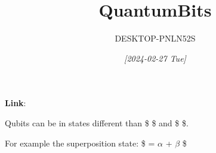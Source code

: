 \documentclass[11pt]{article}
\author{DESKTOP-PNLN52S}
\date{\textit{[2024-02-27 Tue]}}
\title{QuantumBits}
\begin{document}
\maketitle
\tableofcontents

\textbf{Link}:  


Qubits can be in states different than \$ \$ and \$ \$.

For example the superposition state:
\$ \ket{\psi} = \(\alpha\)  + \(\beta\) \$
\end{document}
